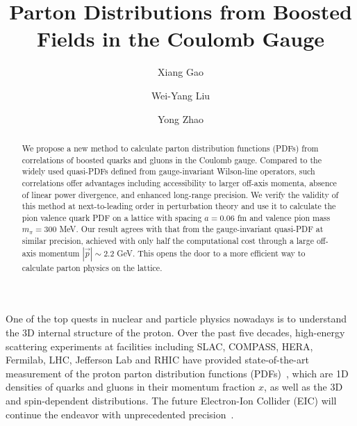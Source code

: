 \documentclass[prd,twocolumn,preprintnumbers,showpacs,nofootinbib,superscriptaddress,notitlepage,floatfix]{revtex4-1}
\begin{document}
\title{Parton Distributions from Boosted Fields in the Coulomb Gauge}


\author{Xiang Gao}

\author{Wei-Yang Liu}

\author{Yong Zhao}

\begin{abstract}
We propose a new method to calculate parton distribution functions (PDFs) from correlations of boosted quarks and gluons in the Coulomb gauge.
Compared to the widely used quasi-PDFs defined from gauge-invariant Wilson-line operators, such correlations offer advantages including accessibility to larger off-axis momenta, absence of linear power divergence, and enhanced long-range precision. We verify the validity of this method at next-to-leading order in perturbation theory and use it to calculate the pion valence quark PDF on a lattice with spacing $a=0.06$ fm and valence pion mass $m_\pi=300$ MeV.
Our result agrees with that from the gauge-invariant quasi-PDF at similar precision, achieved with only half the computational cost through a large off-axis momentum $|\vec{p}|\sim2.2$ GeV.
This opens the door to a more efficient way to calculate parton physics on the lattice.
\end{abstract}

\maketitle

One of the top quests in nuclear and particle physics nowadays is to understand the 3D internal structure of the proton.
Over the past five decades, high-energy scattering experiments at facilities including SLAC, COMPASS, HERA, Fermilab, LHC, Jefferson Lab and RHIC have provided state-of-the-art measurement of the proton parton distribution functions (PDFs)~\cite{ParticleDataGroup:2022pth}, which are 1D densities of quarks and gluons in their momentum fraction $x$, as well as the 3D and spin-dependent distributions. The future Electron-Ion Collider (EIC) will continue the endeavor with unprecedented precision~\cite{Accardi:2012qut,AbdulKhalek:2021gbh}.
\end{document}
